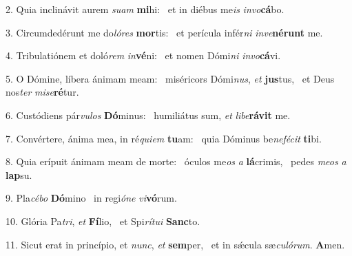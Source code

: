 2. Quia inclinávit aurem \textit{su}\textit{am} \textbf{mi}hi: \ast\  et in diébus me\textit{is} \textit{in}\textit{vo}\textbf{cá}bo.\

3. Circumdedérunt me do\textit{ló}\textit{res} \textbf{mor}tis: \ast\  et perícula infér\textit{ni} \textit{in}\textit{ve}\textbf{né}\textbf{runt} me.\

4. Tribulatiónem et doló\textit{rem} \textit{in}\textbf{vé}ni: \ast\  et nomen Dómi\textit{ni} \textit{in}\textit{vo}\textbf{cá}vi.\

5. O Dómine, líbera ánimam meam: \dag\  miséricors Dómi\textit{nus}, \textit{et} \textbf{jus}tus, \ast\  et Deus nos\textit{ter} \textit{mi}\textit{se}\textbf{ré}tur.\

6. Custódiens pár\textit{vu}\textit{los} \textbf{Dó}minus: \ast\  humiliátus sum, \textit{et} \textit{li}\textit{be}\textbf{rá}\textbf{vit} me.\

7. Convértere, ánima mea, in ré\textit{qui}\textit{em} \textbf{tu}am: \ast\  quia Dóminus be\textit{ne}\textit{fé}\textit{cit} \textbf{ti}bi.\

8. Quia erípuit ánimam meam de morte: \dag\  óculos me\textit{os} \textit{a} \textbf{lá}crimis, \ast\  pedes \textit{me}\textit{os} \textit{a} \textbf{lap}su.\

9. Pla\textit{cé}\textit{bo} \textbf{Dó}mino \ast\  in regi\textit{ó}\textit{ne} \textit{vi}\textbf{vó}rum.\

10. Glória Pa\textit{tri}, \textit{et} \textbf{Fí}lio, \ast\  et Spi\textit{rí}\textit{tu}\textit{i} \textbf{Sanc}to.\

11. Sicut erat in princípio, et \textit{nunc}, \textit{et} \textbf{sem}per, \ast\  et in sǽcula sæ\textit{cu}\textit{ló}\textit{rum}. \textbf{A}men.\


